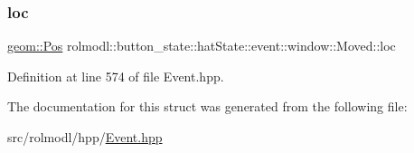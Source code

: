\subsubsection{\texorpdfstring{loc}{loc}}
{\footnotesize\ttfamily \mbox{\hyperlink{structrolmodl_1_1geom_1_1_pos}{geom\+::\+Pos}} rolmodl\+::button\+\_\+state\+::hat\+State\+::event\+::window\+::\+Moved\+::loc}



Definition at line 574 of file Event.\+hpp.



The documentation for this struct was generated from the following file\+:\begin{DoxyCompactItemize}
\item 
src/rolmodl/hpp/\mbox{\hyperlink{_event_8hpp}{Event.\+hpp}}\end{DoxyCompactItemize}
